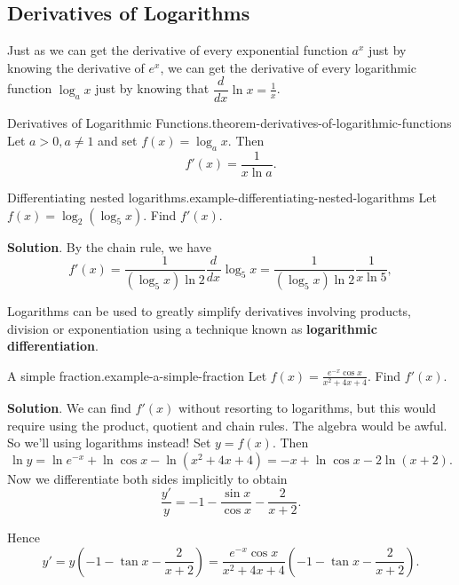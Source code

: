 \documentclass[10pt,]{book}
\newcommand{\terminology}[1]{\textbf{#1}}
\numberwithin{equation}{section}
\newcommand{\dv}[3][]{\dfrac{d^{#1} #2}{d #3^{#1}}}
\begin{document}
\subsection[{Derivatives of Logarithms}]{Derivatives of Logarithms}\label{subsection-derivatives-of-logarithms}
\hypertarget{p-235}{}%
Just as we can get the derivative of every exponential function \(a^{x}\) just by knowing the derivative of \(e^{x}\), we can get the derivative of every logarithmic function \(\log_{a}x\) just by knowing that \(\dv{}{x}\ln x = \frac{1}{x}\).%
\begin{theorem}{Derivatives of Logarithmic Functions.}{}{theorem-derivatives-of-logarithmic-functions}%
\hypertarget{p-236}{}%
Let \(a > 0, a\neq 1\) and set \(f(x) = \log_{a}x\). Then%
\begin{equation*}
f'(x) = \frac{1}{x\ln a}.
\end{equation*}
%
\end{theorem}
\begin{example}{Differentiating nested logarithms.}{example-differentiating-nested-logarithms}%
\hypertarget{p-237}{}%
Let \(f(x) = \log_{2}(\log_{5} x)\). Find \(f'(x)\).%
\par\smallskip%
\noindent\textbf{Solution}.\hypertarget{solution-51}{}\quad%
\hypertarget{p-238}{}%
By the chain rule, we have%
\begin{equation*}
f'(x) = \frac{1}{(\log_{5}x)\ln 2}\dv{}{x}\log_{5}x = \frac{1}{(\log_{5} x)\ln 2}\frac{1}{x\ln 5},
\end{equation*}
%
\end{example}
\hypertarget{p-239}{}%
Logarithms can be used to greatly simplify derivatives involving products, division or exponentiation using a technique known as \terminology{logarithmic differentiation}.%
\begin{example}{A simple fraction.}{example-a-simple-fraction}%
\hypertarget{p-240}{}%
Let \(f(x) = \frac{e^{-x}\cos x}{x^{2} + 4x + 4}\). Find \(f'(x)\).%
\par\smallskip%
\noindent\textbf{Solution}.\hypertarget{solution-52}{}\quad%
\hypertarget{p-241}{}%
We can find \(f'(x)\) without resorting to logarithms, but this would require using the product, quotient and chain rules. The algebra would be awful. So we'll using logarithms instead! Set \(y = f(x)\). Then%
\begin{equation*}
\ln y = \ln e^{-x} + \ln\cos x - \ln (x^{2} + 4x + 4) = -x + \ln\cos x - 2\ln(x+2).
\end{equation*}
Now we differentiate both sides implicitly to obtain%
\begin{equation*}
\frac{y'}{y} = -1 - \frac{\sin x}{\cos x} - \frac{2}{x+2}.
\end{equation*}
%
\par
\hypertarget{p-242}{}%
Hence%
\begin{equation*}
y' = y\left(-1 - \tan x - \frac{2}{x+2}\right) = \frac{e^{-x}\cos x}{x^{2} + 4x + 4}\left(-1 - \tan x - \frac{2}{x+2}\right).
\end{equation*}
%
\end{example}
\end{document}
